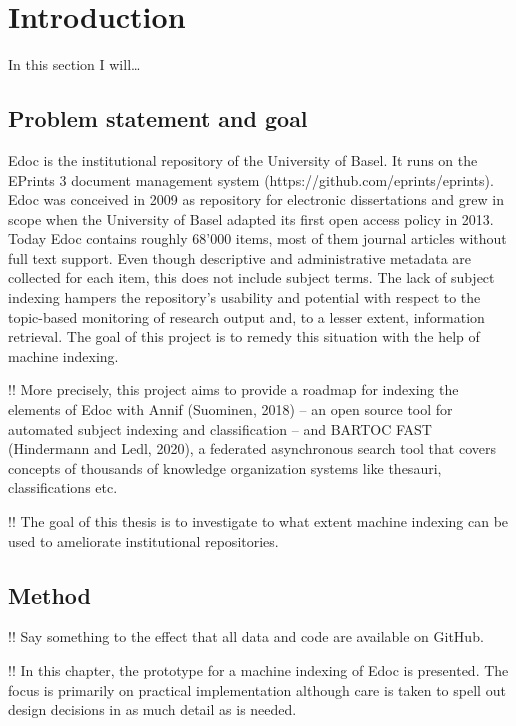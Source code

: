 \hypertarget{introduction}{%
\section{Introduction}\label{introduction}}

In this section I will\ldots{}

\hypertarget{problem-statement-and-goal}{%
\subsection{Problem statement and
goal}\label{problem-statement-and-goal}}

Edoc is the institutional repository of the University of Basel. It runs
on the EPrints 3 document management system
(https://github.com/eprints/eprints). Edoc was conceived in 2009 as
repository for electronic dissertations and grew in scope when the
University of Basel adapted its first open access policy in 2013. Today
Edoc contains roughly 68'000 items, most of them journal articles
without full text support. Even though descriptive and administrative
metadata are collected for each item, this does not include subject
terms. The lack of subject indexing hampers the repository's usability
and potential with respect to the topic-based monitoring of research
output and, to a lesser extent, information retrieval. The goal of this
project is to remedy this situation with the help of machine indexing.

!! More precisely, this project aims to provide a roadmap for indexing
the elements of Edoc with Annif (Suominen, 2018) -- an open source tool
for automated subject indexing and classification -- and BARTOC FAST
(Hindermann and Ledl, 2020), a federated asynchronous search tool that
covers concepts of thousands of knowledge organization systems like
thesauri, classifications etc.

!! The goal of this thesis is to investigate to what extent machine
indexing can be used to ameliorate institutional repositories.

\hypertarget{method}{%
\subsection{Method}\label{method}}

!! Say something to the effect that all data and code are available on
GitHub.

!! In this chapter, the prototype for a machine indexing of Edoc is
presented. The focus is primarily on practical implementation although
care is taken to spell out design decisions in as much detail as is
needed.

